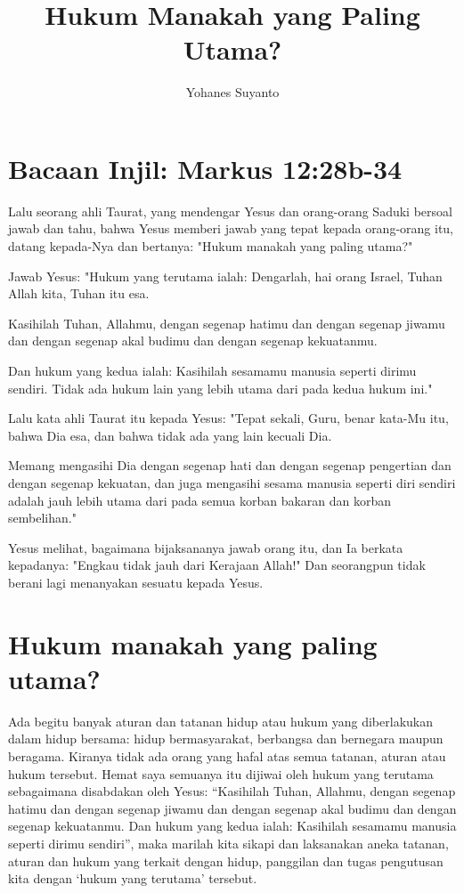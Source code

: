 \documentclass[12pt,a4paper,twoside]{article}
\author{Yohanes Suyanto}
\title{Hukum Manakah yang Paling Utama?}
\begin{document}
\onehalfspacing
\section*{Bacaan Injil: Markus 12:28b-34}
Lalu seorang ahli Taurat, yang mendengar Yesus dan orang-orang Saduki bersoal jawab dan tahu, bahwa Yesus memberi jawab yang tepat kepada orang-orang itu, datang kepada-Nya dan bertanya: "Hukum manakah yang paling utama?"

Jawab Yesus: "Hukum yang terutama ialah: Dengarlah, hai orang Israel, Tuhan Allah kita, Tuhan itu esa.

Kasihilah Tuhan, Allahmu, dengan segenap hatimu dan dengan segenap jiwamu dan dengan segenap akal budimu dan dengan segenap kekuatanmu.

Dan hukum yang kedua ialah: Kasihilah sesamamu manusia seperti dirimu sendiri. Tidak ada hukum lain yang lebih utama dari pada kedua hukum ini."

Lalu kata ahli Taurat itu kepada Yesus: "Tepat sekali, Guru, benar kata-Mu itu, bahwa Dia esa, dan bahwa tidak ada yang lain kecuali Dia.

Memang mengasihi Dia dengan segenap hati dan dengan segenap pengertian dan dengan segenap kekuatan, dan juga mengasihi sesama manusia seperti diri sendiri adalah jauh lebih utama dari pada semua korban bakaran dan korban sembelihan."

Yesus melihat, bagaimana bijaksananya jawab orang itu, dan Ia berkata kepadanya: "Engkau tidak jauh dari Kerajaan Allah!" Dan seorangpun tidak berani lagi menanyakan sesuatu kepada Yesus.

\section*{Hukum manakah yang paling utama?}
Ada begitu banyak aturan dan tatanan hidup atau hukum yang diberlakukan dalam hidup bersama: hidup bermasyarakat, berbangsa dan bernegara maupun beragama. Kiranya tidak ada orang yang hafal atas semua tatanan, aturan atau hukum tersebut.  Hemat saya semuanya itu dijiwai oleh hukum yang terutama sebagaimana disabdakan oleh Yesus: “Kasihilah Tuhan, Allahmu, dengan segenap hatimu dan dengan segenap jiwamu dan dengan segenap akal budimu dan dengan segenap kekuatanmu. Dan hukum yang kedua ialah: Kasihilah sesamamu manusia seperti dirimu sendiri”, maka marilah kita sikapi dan laksanakan aneka tatanan, aturan dan hukum yang terkait dengan hidup, panggilan dan tugas pengutusan kita dengan ‘hukum yang terutama’ tersebut. 
\end{document}

